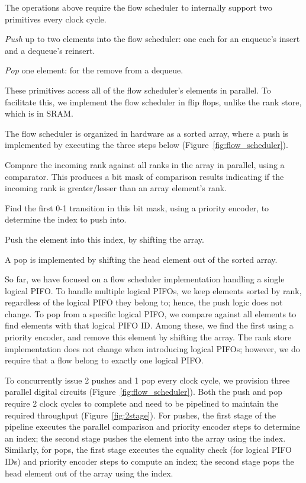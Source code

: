 
The operations above require the flow scheduler to internally support two
primitives every clock cycle.
\begin{CompactEnumerate}
\item {\em Push} up to two elements into the flow scheduler: one each for an
  enqueue's insert and a dequeue's reinsert.
\item {\em Pop} one element: for the remove from a dequeue.
\end{CompactEnumerate}
These primitives access all of the flow scheduler's elements in parallel. To
facilitate this, we implement the flow scheduler in flip flops, unlike the rank
store, which is in SRAM.

The flow scheduler is organized in hardware as a sorted array, where a push is
implemented by executing the three steps below
(Figure~\ref{fig:flow_scheduler}).
\begin{CompactEnumerate}
\item Compare the incoming rank against all ranks in the array in parallel, using a comparator.
  This produces a bit mask of comparison results indicating if the incoming rank
  is greater/lesser than an array element's rank.
\item Find the first 0-1 transition in this bit mask, using a priority encoder,
  to determine the index to push into.
\item Push the element into this index, by shifting the array.
\end{CompactEnumerate}
A pop is implemented by shifting the head element out of the sorted array.

So far, we have focused on a flow scheduler implementation handling a single
logical PIFO. To handle multiple logical PIFOs, we keep elements sorted by
rank, regardless of the logical PIFO they belong to; hence, the push logic
does not change.  To pop from a specific logical PIFO, we compare against all
elements to find elements with that logical PIFO ID. Among these, we find the
first using a priority encoder, and remove this element by shifting the array.
The rank store implementation does not change when introducing logical PIFOs;
however, we do require that a flow belong to exactly one logical PIFO.

To concurrently issue 2 pushes and 1 pop every clock cycle, we provision three
parallel digital circuits (Figure~\ref{fig:flow_scheduler}). Both the
push and pop require 2 clock cycles to complete and need to be pipelined
 to maintain the required throughput (Figure~\ref{fig:2stage}). For pushes, the first stage of the pipeline executes
the parallel comparison and priority encoder steps to determine an index; the
second stage pushes the element into the array using the index.  Similarly, for
pops, the first stage executes the equality check (for logical PIFO IDs) and
priority encoder steps to compute an index; the second stage pops the head
element out of the array using the index.

